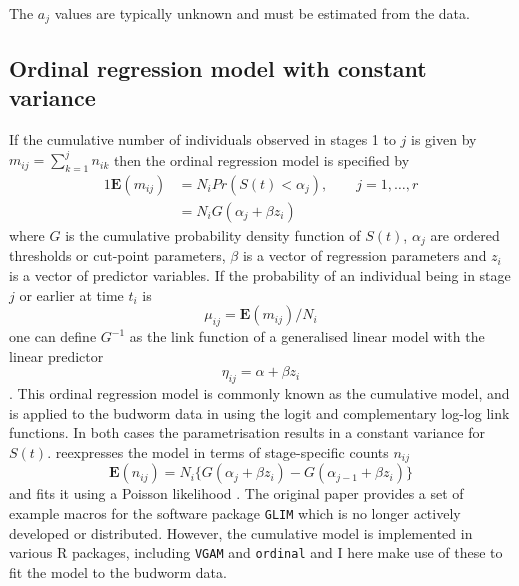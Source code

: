 The $a_j$ values are typically unknown and must be estimated from the data.

\subsection{Ordinal regression model with constant variance }
If the cumulative number of individuals observed in stages 1 to $j$ is given by $m_{ij}=\sum_{k=1}^jn_{ik}$ then the ordinal regression model \citep{mccullagh1980} is specified by %
\begin{alignat}{1}
\mathbf{E}(m_{ij})&=N_iPr(S(t) < \alpha_j), \qquad j = 1,\dots ,r\\
&=N_iG(\alpha_j + \beta z_i)
\end{alignat}
where $G$ is the cumulative probability density function of $S(t)$, $\alpha_j$ are ordered thresholds or cut-point parameters, $\beta$ is a vector of regression parameters and $z_i$ is a vector of predictor variables.
If the probability of an individual being in stage $j$ or earlier at time $t_i$ is $$\mu_{ij} = \mathbf{E}(m_{ij})/N_i$$ one can define $G^{-1}$ as the link function of a generalised linear model with the linear predictor $$\eta_{ij}=\alpha+\beta z_i$$. This ordinal regression model is commonly known as the cumulative model, and is applied to the budworm data in \citep{candy1991modeling} using the logit and complementary log-log link functions. In  both cases the parametrisation results in a constant variance for $S(t)$. \citet{candy1991modeling} reexpresses the model in terms of stage-specific counts $n_{ij}$  
\begin{equation}
\mathbf{E}(n_{ij})=N_i\{G(\alpha_j + \beta z_i) - G(\alpha_{j-1} + \beta z_i)\}
\end{equation}
and fits it using a Poisson likelihood \citep{thompson1981composite}. The original paper provides a set of example macros for the software package \verb+GLIM+ \citep{aitkin1989statistical} which is no longer actively developed or distributed. However, the cumulative model is implemented in various R packages, including \verb+VGAM+ \citep{VGAM} and \verb+ordinal+ \cite{ordinal} and I here make use of these to fit the model to the budworm data.

